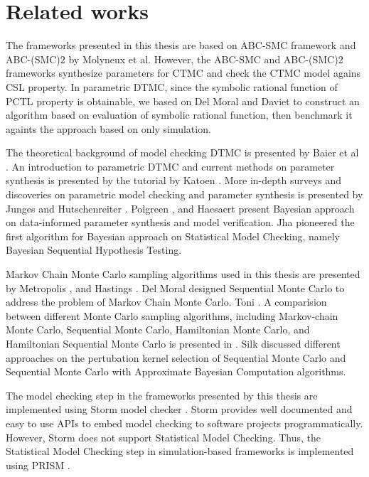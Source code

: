 \chapter{Related works}
The frameworks presented in this thesis are based on ABC-SMC framework \cite{molyneux2019bayesian}
and ABC-(SMC)2 \cite{molyneux2020abc} by Molyneux et al. However, the ABC-SMC and ABC-(SMC)2
frameworks synthesize parameters for CTMC and check the CTMC model agains CSL property. In
parametric DTMC, since the symbolic rational function of PCTL property is obtainable, we based on
Del Moral \cite{del2006sequential} and Daviet \cite{daviet2018inference} to construct an algorithm
based on evaluation of symbolic rational function, then benchmark it againts the approach based on
only simulation.

The theoretical background of model checking DTMC is presented by Baier et al
\cite{baier2008principles}. An introduction to parametric DTMC and current methods on parameter
synthesis is presented by the tutorial by Katoen \cite{katoen2016probabilistic}. More in-depth
surveys and discoveries on parametric model checking and parameter synthesis is presented by Junges
\cite{junges2020parameter} and Hutschenreiter \cite{hutschenreiter2017parametric}. Polgreen
\cite{polgreen2016data}, and Haesaert \cite{haesaert2015data} present Bayesian approach on
data-informed parameter synthesis and model verification. Jha \cite{jha2009bayesian} pioneered the
first algorithm for Bayesian approach on Statistical Model Checking, namely Bayesian Sequential
Hypothesis Testing.

Markov Chain Monte Carlo sampling algorithms used in this thesis are presented by Metropolis
\cite{metropolis1953equation}, and Hastings \cite{hastings1970monte}. Del Moral
\cite{del2006sequential} designed Sequential Monte Carlo to address the problem of Markov Chain
Monte Carlo. Toni \cite{toni2009approximate}. A comparision between different Monte Carlo
sampling algorithms, including Markov-chain Monte Carlo, Sequential Monte Carlo, Hamiltonian
Monte Carlo, and Hamiltonian Sequential Monte Carlo is presented in \cite{daviet2018inference}. Silk
\cite{silk2012optimizing} discussed different approaches on the pertubation kernel selection of
Sequential Monte Carlo and Sequential Monte Carlo with Approximate Bayesian Computation algorithms.

The model checking step in the frameworks presented by this thesis are implemented using Storm model
checker \cite{hensel2020probabilistic}. Storm provides well documented and easy to use APIs to embed
model checking to software projects programmatically. However, Storm does not support Statistical
Model Checking. Thus, the Statistical Model Checking step in simulation-based frameworks is
implemented using PRISM \cite{kwiatkowska2011prism}.
